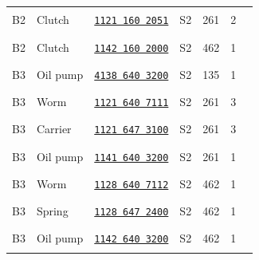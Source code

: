 \documentclass[10pt,letterpaper]{article}
\begin{document}
\begin{longtable}{@{}l>{\raggedright\arraybackslash}p{2.58in}p{1.23in}llrr@{}}
\rowcolor{black!6}B2 & Clutch & \href{https://rduncangt.github.io/frk-management/parts/11211602051/}{\texttt{1121 160 2051}} & \textcolor{frkSupervision}{S2} & \textcolor{frkApplication}{\mbox{261}} & 2 & \rule{0.23in}{0.3pt}\\

B2 & Clutch & \href{https://rduncangt.github.io/frk-management/parts/11421602000/}{\texttt{1142 160 2000}} & \textcolor{frkSupervision}{S2} & \textcolor{frkApplication}{\mbox{462}} & 1 & \rule{0.23in}{0.3pt}\\

\rowcolor{black!6}B3 & Oil pump & \href{https://rduncangt.github.io/frk-management/parts/41386403200/}{\texttt{4138 640 3200}} & \textcolor{frkSupervision}{S2} & \textcolor{frkApplication}{\mbox{135}} & 1 & \rule{0.23in}{0.3pt}\\

B3 & Worm & \href{https://rduncangt.github.io/frk-management/parts/11216407111/}{\texttt{1121 640 7111}} & \textcolor{frkSupervision}{S2} & \textcolor{frkApplication}{\mbox{261}} & 3 & \rule{0.23in}{0.3pt}\\

\rowcolor{black!6}B3 & Carrier & \href{https://rduncangt.github.io/frk-management/parts/11216473100/}{\texttt{1121 647 3100}} & \textcolor{frkSupervision}{S2} & \textcolor{frkApplication}{\mbox{261}} & 3 & \rule{0.23in}{0.3pt}\\

B3 & Oil pump & \href{https://rduncangt.github.io/frk-management/parts/11416403200/}{\texttt{1141 640 3200}} & \textcolor{frkSupervision}{S2} & \textcolor{frkApplication}{\mbox{261}} & 1 & \rule{0.23in}{0.3pt}\\

\rowcolor{black!6}B3 & Worm & \href{https://rduncangt.github.io/frk-management/parts/11286407112/}{\texttt{1128 640 7112}} & \textcolor{frkSupervision}{S2} & \textcolor{frkApplication}{\mbox{462}} & 1 & \rule{0.23in}{0.3pt}\\

B3 & Spring & \href{https://rduncangt.github.io/frk-management/parts/11286472400/}{\texttt{1128 647 2400}} & \textcolor{frkSupervision}{S2} & \textcolor{frkApplication}{\mbox{462}} & 1 & \rule{0.23in}{0.3pt}\\

\rowcolor{black!6}B3 & Oil pump & \href{https://rduncangt.github.io/frk-management/parts/11426403200/}{\texttt{1142 640 3200}} & \textcolor{frkSupervision}{S2} & \textcolor{frkApplication}{\mbox{462}} & 1 & \rule{0.23in}{0.3pt}\\


\end{longtable}
\end{document}
